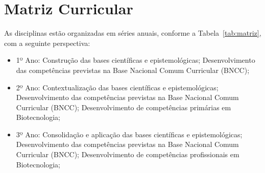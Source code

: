 \documentclass[11pt,fleqn]{book} %
\begin{document}
\section{Matriz Curricular}\label{matriz}

As disciplinas estão organizadas em séries anuais, conforme a Tabela~\ref{tab:matriz}, com a seguinte perspectiva:
\begin{itemize}
	\item 1º Ano: Construção das bases científicas e epistemológicas; Desenvolvimento das competências previstas na Base Nacional Comum Curricular (BNCC);
	\item 2º Ano: Contextualização das bases científicas e epistemológicas; Desenvolvimento das competências previstas na Base Nacional Comum Curricular (BNCC); Desenvolvimento de competências primárias em Biotecnologia;
	\item 3º Ano: Consolidação e aplicação das bases científicas e epistemológicas; Desenvolvimento das competências previstas na Base Nacional Comum Curricular (BNCC); Desenvolvimento de competências profissionais em Biotecnologia;
\end{itemize}
\end{document}
